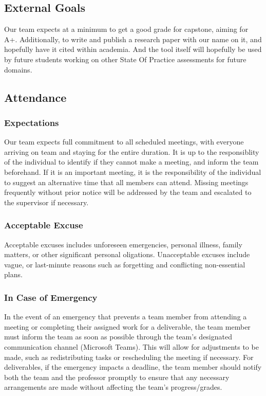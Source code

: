 \documentclass{article}
\begin{document}

\subsection*{External Goals}

Our team expects at a minimum to get a good grade for capstone, aiming for A+. Additionally, to write and publish a research paper with our name on it, and hopefully have it cited within academia.
And the tool itself will hopefully be used by future students working on other State Of Practice assessments for future domains.

\subsection*{Attendance}

\subsubsection*{Expectations}

Our team expects full commitment to all scheduled meetings, with everyone arriving on team and staying for the entire duration. It is up to the responsiblity of the individual to identify if they cannot make a meeting, and inform the team beforehand.
If it is an important meeting, it is the responsibility of the individual to suggest an alternative time that all members can attend. Missing meetings frequently without prior notice will be addressed by the team and escalated to the supervisor if necessary.

\subsubsection*{Acceptable Excuse}

Acceptable excuses includes unforeseen emergencies, personal illness, family matters, or other significant personal oligations. Unacceptable excuses include vague, or last-minute reasons such as forgetting and conflicting non-essential plans.

\subsubsection*{In Case of Emergency}

In the event of an emergency that prevents a team member from attending a meeting or completing
their assigned work for a deliverable, the team member must inform the team as soon as possible
through the team's designated communication channel (Microsoft Teams). This will
allow for adjustments to be made, such as redistributing tasks or rescheduling the meeting if necessary.
For deliverables, if the emergency impacts a deadline, the team member should notify both the team and the professor promptly to ensure that any necessary
arrangements are made without affecting the team's progress/grades.
\end{document}
